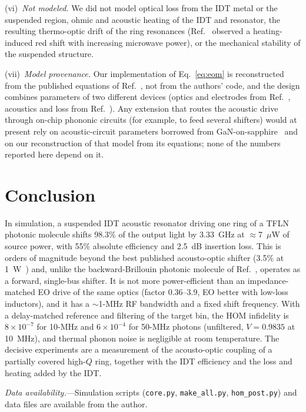 \documentclass[aps,prapplied,reprint,superscriptaddress,amsmath,amssymb,floatfix]{revtex4-2}
\begin{document}
(vi)~\emph{Not modeled.} We did not model optical loss from the IDT metal or the suspended region, ohmic and acoustic heating of the IDT and resonator, the resulting thermo-optic drift of the ring resonances (Ref.~\cite{Shao2019} observed a heating-induced red shift with increasing microwave power), or the mechanical stability of the suspended structure.

(vii)~\emph{Model provenance.} Our implementation of Eq.~\eqref{eq:eom} is reconstructed from the published equations of Ref.~\cite{Hu2021}, not from the authors' code, and the design combines parameters of two different devices (optics and electrodes from Ref.~\cite{Hu2021}, acoustics and loss from Ref.~\cite{Shao2019}). Any extension that routes the acoustic drive through on-chip phononic circuits (for example, to feed several shifters) would at present rely on acoustic-circuit parameters borrowed from GaN-on-sapphire~\cite{Xu2025} and on our reconstruction of that model from its equations; none of the numbers reported here depend on it.

\section{Conclusion}
In simulation, a suspended IDT acoustic resonator driving one ring of a TFLN photonic molecule shifts 98.3\% of the output light by 3.33~GHz at $\approx$7~$\mu$W of source power, with 55\% absolute efficiency and 2.5~dB insertion loss. This is orders of magnitude beyond the best published acousto-optic shifter (3.5\% at 1~W~\cite{Shao2020}) and, unlike the backward-Brillouin photonic molecule of Ref.~\cite{Zhu2025ao}, operates as a forward, single-bus shifter. It is not more power-efficient than an impedance-matched EO drive of the same optics (factor 0.36--3.9, EO better with low-loss inductors), and it has a $\sim$1-MHz RF bandwidth and a fixed shift frequency. With a delay-matched reference and filtering of the target bin, the HOM infidelity is $8\times10^{-7}$ for 10-MHz and $6\times10^{-4}$ for 50-MHz photons (unfiltered, $V=0.9835$ at 10~MHz), and thermal phonon noise is negligible at room temperature. The decisive experiments are a measurement of the acousto-optic coupling of a partially covered high-$Q$ ring, together with the IDT efficiency and the loss and heating added by the IDT.

\emph{Data availability.}---Simulation scripts (\texttt{core.py}, \texttt{make\_all.py}, \texttt{hom\_post.py}) and data files are available from the author.


\end{document}
